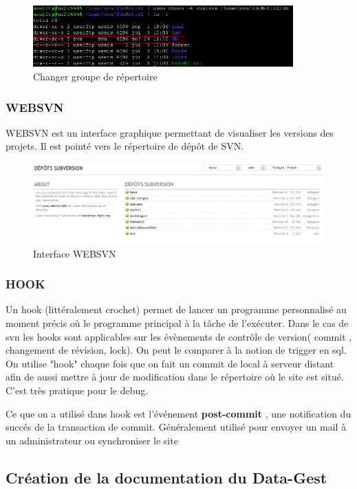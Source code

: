 \begin{figure}[hbtp]
\center
\includegraphics[width=10cm]{body/images/svn-problem-permission.png}
\caption{Changer groupe de répertoire}
\end{figure}

\subsubsection{WEBSVN}
WEBSVN est un interface graphique permettant de visualiser les versions des projets. Il est pointé vers le répertoire de dépôt de SVN.
\begin{figure}[hbtp]
\center
\includegraphics[width=15cm]{body/images/websvn.png}
\caption{Interface WEBSVN}
\end{figure}


\subsubsection{HOOK}
Un hook (littéralement crochet) permet de lancer un programme personnalisé au moment précis où le programme principal à la tâche de l’exécuter. Dans le cas de svn les hooks sont applicables sur les évènements de contrôle de version( commit , changement de révision, lock). On peut le comparer à la notion de trigger en sql.
On utilise "hook" chaque fois que on fait un commit de local à serveur distant afin de aussi mettre à jour de modification dans le répertoire où le site est situé. C'est très pratique pour le debug.

Ce que on a utilisé dans hook est l'événement \textbf{post-commit} , une notification du succés de la transaction de commit. Généralement utilisé pour envoyer un mail à un administrateur ou synchroniser le site 


\subsection{Création de la documentation du Data-Gest}
